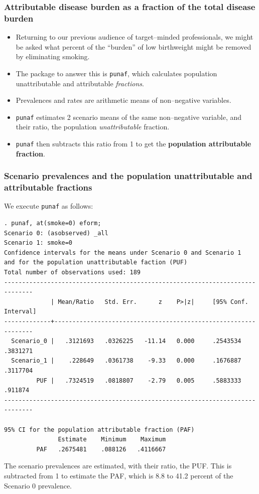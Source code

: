 \documentclass[11pt]{beamer}
\begin{document}
\begin{frame}
\frametitle{Attributable disease burden as a fraction of the total disease burden}

\begin{itemize}

\item<2-> Returning to our previous audience of target--minded professionals,
we might be asked what percent of the ``burden'' of low birthweight might be removed by eliminating smoking.

\item<3-> The package to answer this is \texttt{punaf},
which calculates population unattributable and attributable \textit{fractions}.

\item<4-> Prevalences and rates are arithmetic means of non--negative variables.

\item<5-> \texttt{punaf} estimates 2 scenario means of the same non--negative variable,
and their ratio, the population \textit{unattributable} fraction.

\item<6-> \texttt{punaf} then subtracts this ratio from 1
to get the \textbf{population attributable fraction}.

\end{itemize}

\end{frame}

\begin{frame}[fragile]
\frametitle{Scenario prevalences and the population unattributable and attributable fractions}

We execute \texttt{punaf} as follows:

\tiny
\begin{verbatim}
. punaf, at(smoke=0) eform;
Scenario 0: (asobserved) _all
Scenario 1: smoke=0
Confidence intervals for the means under Scenario 0 and Scenario 1
and for the population unattributable faction (PUF)
Total number of observations used: 189
------------------------------------------------------------------------------
             | Mean/Ratio   Std. Err.      z    P>|z|     [95% Conf. Interval]
-------------+----------------------------------------------------------------
  Scenario_0 |   .3121693   .0326225   -11.14   0.000     .2543534    .3831271
  Scenario_1 |    .228649   .0361738    -9.33   0.000     .1676887    .3117704
         PUF |   .7324519   .0818807    -2.79   0.005     .5883333     .911874
------------------------------------------------------------------------------

95% CI for the population attributable fraction (PAF)
               Estimate    Minimum    Maximum 
         PAF   .2675481    .088126   .4116667 
\end{verbatim}
\normalsize

The scenario prevalences are estimated, with their ratio, the PUF.
This is subtracted from 1 to estimate the PAF,
which is 8.8 to 41.2 percent of the Scenario 0 prevalence.

\end{frame}
\end{document}
